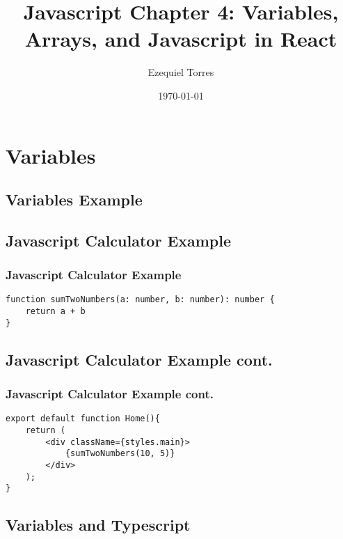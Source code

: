 \documentclass{beamer}
\begin{document}
\title{Javascript Chapter 4: Variables, Arrays, and Javascript in React}
\author{Ezequiel Torres}
\date{\today}
\frame{\titlepage}

\section{Variables}



\subsection{Variables Example}
\fontsize{9pt}{10pt}\selectfont
\begin{frame}[fragile]
\subsection{Javascript Calculator Example}
\frametitle{Javascript Calculator Example}
\begin{lstlisting}
function sumTwoNumbers(a: number, b: number): number {
    return a + b
}
\end{lstlisting}
\end{frame}

\fontsize{11pt}{22pt}\selectfont
\begin{frame}[fragile]
\subsection{Javascript Calculator Example cont.}
\frametitle{Javascript Calculator Example cont.}
\begin{lstlisting}
export default function Home(){
    return (
        <div className={styles.main}>
            {sumTwoNumbers(10, 5)}
        </div>
    );
}
\end{lstlisting}
\end{frame}

\subsection{Variables and Typescript}
\end{document}
